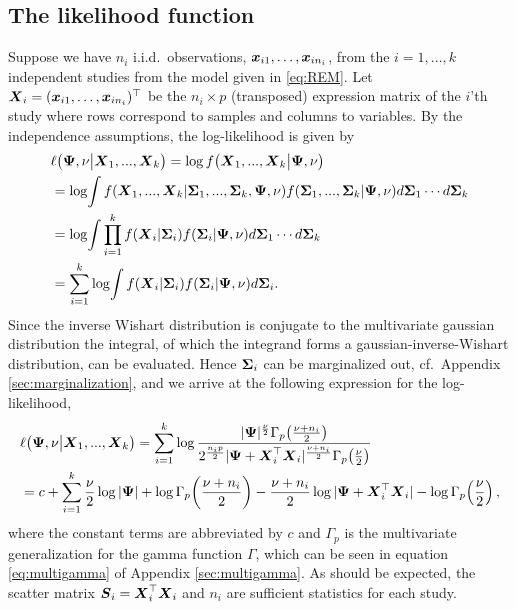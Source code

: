 \documentclass{article}\usepackage[]{graphicx}\usepackage[]{color}
\begin{document}
\subsection{The likelihood function}
Suppose we have $n_i$ i.i.d.\ observations, ${\boldsymbol{x}}_{i1}, \dots,{\boldsymbol{x}}_{in_i}$, from the $i = 1,...,k$ independent studies from the model given in \eqref{eq:REM}.
Let ${\boldsymbol{X}}_i = ({\boldsymbol{x}}_{i1}, \dots,{\boldsymbol{x}}_{in_i})^\top$ be the $n_i \times p$ (transposed) expression matrix of the $i$'th study where rows correspond to samples and columns to variables. By the independence assumptions, the log-likelihood is given by
\begin{align*}
  &\ell\!\left(\vPsi, \nu \big|\vX_1, ..., \vX_k  \right)
  = \log f\!\left(\vX_1, ..., \vX_k \big| \vPsi, \nu \right) \\
  &= \log\!\int %
               f(\vX_1, ...,\vX_k |
               \vSigma_1, ..., \vSigma_k, \vPsi, \nu)
             f(\vSigma_1, ..., \vSigma_k | \vPsi, \nu)
             d\vSigma_1 \cdots d\vSigma_k \\
  &= \log\!\int %
               \prod_{i=1}^k
               f(\vX_i | \vSigma_i)
               f(\vSigma_i | \vPsi, \nu)
               d\vSigma_1 \cdots d\vSigma_k \\
  &= \sum_{i=1}^k \log\!\int
               f(\vX_i | \vSigma_i)
               f(\vSigma_i | \vPsi, \nu)
               d\vSigma_i.
\end{align*}
Since the inverse Wishart distribution is conjugate to the multivariate gaussian distribution the integral, of which the integrand forms a gaussian-inverse-Wishart distribution, can be evaluated. Hence ${\boldsymbol{\Sigma}}_i$ can be marginalized out, cf.\  Appendix \ref{sec:marginalization}, and we arrive at the following expression for the log-likelihood,
\small
\begin{align}
  &\ell\!\left(\vPsi, \nu \big| \vX_1, ..., \vX_k \right) %
  = \sum_{i=1}^k \log
    \frac{|\vPsi|^\frac{\nu}{2} \Gamma_p\!\left(\frac{\nu+n_i}{2}\right)}
         {2^\frac{n_i p}{2} |\vPsi +\vX_i^\top\vX_i|^\frac{\nu+n_i}{2}
          \Gamma_p\!\left(\frac{\nu}{2}\right)}          \notag\\
  &= c + \sum_{i=1}^k
            \frac{\nu}{2}  \log |\vPsi|
            + \log \Gamma_p\!\left(\frac{\nu + n_i}{2}\right)
            - \frac{\nu + n_i}{2}\log|\vPsi +\vX_i^\top\vX_i|
            - \log \Gamma_p\!\left(\frac{\nu}{2}\right),
    \label{eq:loglik}
\end{align}
\normalsize
where the constant terms are abbreviated by $c$ and $\Gamma_p$ is the multivariate generalization for the gamma function $\Gamma$, which can be seen in equation \eqref{eq:multigamma} of Appendix \ref{sec:multigamma}. As should be expected, the scatter matrix $\boldsymbol{S}_i ={\boldsymbol{X}}_i^\top{\boldsymbol{X}}_i$ and $n_i$ are sufficient statistics for each study.
\end{document}
